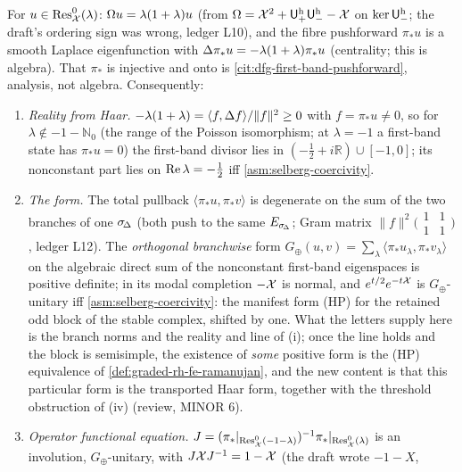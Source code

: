 \begin{theorem}
\label{thm:selberg-first-band-form}
For $u\in\operatorname{Res}^0_{\mathcal X}(\lambda)$: $\Omega u = \lambda(1+\lambda)u$ (from $\Omega = \mathcal X^2+{\mathsf U^{\mathrm h}_{+}}{\mathsf U^{\mathrm h}_{-}}-
\mathcal X$ on $\ker{\mathsf U^{\mathrm h}_{-}}$; the draft's ordering sign was wrong, ledger L10), and the fibre
pushforward $\pi_*u$ is a smooth Laplace eigenfunction with $\Delta\pi_*u = -\lambda(1+\lambda)\pi_*u$
(centrality; this is algebra). That $\pi_*$ is injective and onto is \cref{cit:dfg-first-band-pushforward},
analysis, not algebra. Consequently:
\begin{enumerate}
\item[(i)] \emph{Reality from Haar.} $-\lambda(1+\lambda) = \langle f,\Delta f\rangle/\|f\|^2\ge0$
with $f = \pi_*u\ne0$, so for $\lambda\notin-1-\mathbb N_0$ (the range of the Poisson
isomorphism; at $\lambda = -1$ a first-band state has $\pi_*u = 0$) the first-band divisor lies in
$(-\tfrac12+i\mathbb R)\cup[-1,0]$; its nonconstant part lies on $\operatorname{Re}\lambda = -\tfrac12$ iff
\cref{asm:selberg-coercivity}.
\item[(ii)] \emph{The form.} The total pullback $\langle\pi_*u,\pi_*v\rangle$ is degenerate on the
sum of the two branches of one $\sigma_{\!\Delta}$ (both push to the same $E_{\sigma_{\!\Delta}}$; Gram matrix
$\|f\|^2\bigl(\begin{smallmatrix}1&1\\1&1\end{smallmatrix}\bigr)$, ledger L12). The
\emph{orthogonal branchwise} form $G_\oplus(u,v) = \sum_\lambda\langle\pi_*u_\lambda,\pi_*v_\lambda\rangle$
on the algebraic direct sum of the nonconstant first-band eigenspaces is positive definite; in its
modal completion $-\mathcal X$ is normal, and $e^{t/2}e^{-t\mathcal X}$ is $G_\oplus$-unitary iff
\cref{asm:selberg-coercivity}: the manifest form (HP) for the retained odd block of the stable
complex, shifted by one. What the letters supply here is the branch norms and the reality and
line of (i); once the line holds and the block is semisimple, the existence of \emph{some}
positive form is the (HP) equivalence of \cref{def:graded-rh-fe-ramanujan}, and the new content
is that this particular form is the transported Haar form, together with the threshold
obstruction of (iv) (review, MINOR 6).
\item[(iii)] \emph{Operator functional equation.} $J = (\pi_*|_{\operatorname{Res}^0_{\mathcal X}(-1-\lambda)})^{-1}\pi_*|_{\operatorname{Res}^0_{\mathcal X}(\lambda)}$
is an involution, $G_\oplus$-unitary, with $J\mathcal X J^{-1} = 1-\mathcal X$ (the draft wrote $-1-X$,

\end{enumerate}
\end{theorem}

